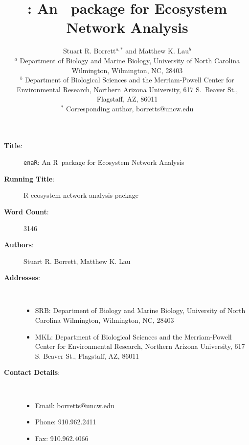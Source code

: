 \documentclass[11pt]{article}
\title{\enaR: An \R\ package for Ecosystem Network Analysis}
\author{Stuart R. Borrett$^{a,*}$ and Matthew K. Lau$^b$
  \\ {\footnotesize $^a$ Department of Biology and Marine Biology,
    University of North Carolina Wilmington, Wilmington, NC, 28403}
  \\ {\footnotesize $^b$ Department of Biological Sciences and the
    Merriam-Powell Center for Environmental Research, Northern Arizona
    University, 617 S.\ Beaver St., Flagstaff, AZ, 86011}
  \\ {\footnotesize $^*$ Corresponding author, borretts@uncw.edu} }
\newcommand{\R}{R}
\newcommand{\enaR}{\texttt{enaR}}
\begin{document}

\begin{description}
  \item[\textbf{Title}:] \enaR: An \R\ package for Ecosystem Network Analysis
  \item[\textbf{Running Title}:] R ecosystem network analysis package
  \item[\textbf{Word Count}:] 3146
  \item[\textbf{Authors}:] Stuart R. Borrett, Matthew K. Lau
  \item[\textbf{Addresses}:] \
    \begin{itemize}
    \item SRB: Department of Biology and Marine Biology, University of
      North Carolina Wilmington, Wilmington, NC, 28403
    \item MKL: Department of Biological Sciences and the
      Merriam-Powell Center for Environmental Research, Northern
      Arizona University, 617 S. Beaver St., Flagstaff, AZ, 86011
    \end{itemize}
  \item[\textbf{Contact Details}:] \
    \begin{itemize}
    \item Email: borretts@uncw.edu
    \item Phone: 910.962.2411
    \item Fax: 910.962.4066
    \end{itemize}
\end{description}

\pagebreak

\maketitle
\end{document}
